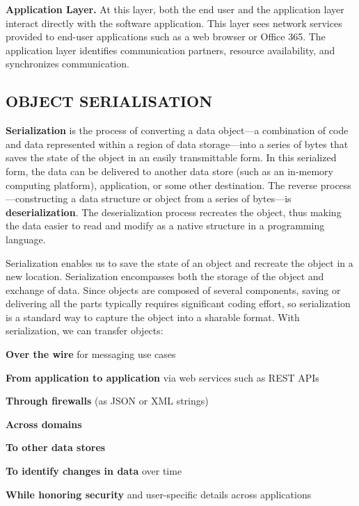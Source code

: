 \documentclass[../report.tex]{subfiles}
\begin{document}
\textbf{Application Layer.} At this layer, both the end user and the application layer interact directly with the software application. This layer sees network services provided to end-user applications such as a web browser or Office 365. The application layer identifies communication partners, resource availability, and synchronizes communication.


\subsection{OBJECT SERIALISATION} %

\textbf{Serialization} is the process of converting a data object—a combination of code and data represented within a region of data storage—into a series of bytes that saves the state of the object in an easily transmittable form. In this serialized form, the data can be delivered to another data store (such as an in-memory computing platform), application, or some other destination. The reverse process—constructing a data structure or object from a series of bytes—is \textbf{deserialization}. The deserialization process recreates the object, thus making the data easier to read and modify as a native structure in a programming language.

Serialization enables us to save the state of an object and recreate the object in a new location. Serialization encompasses both the storage of the object and exchange of data. Since objects are composed of several components, saving or delivering all the parts typically requires significant coding effort, so serialization is a standard way to capture the object into a sharable format. With serialization, we can transfer objects:

\textbf{Over the wire} for messaging use cases

\textbf{From application to application} via web services such as REST APIs

\textbf{Through firewalls} (as JSON or XML strings)

\textbf{Across domains}

\textbf{To other data stores}

\textbf{To identify changes in data} over time

\textbf{While honoring security} and user-specific details across applications
\end{document}
